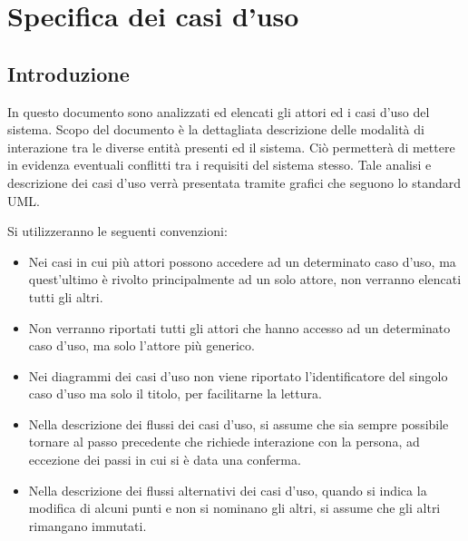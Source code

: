 \chapter{Specifica dei casi d'uso}

\section{Introduzione}
In questo documento sono analizzati ed elencati gli attori ed i casi d'uso del sistema.
Scopo del documento è la dettagliata descrizione delle modalità di interazione tra le diverse entità presenti ed il sistema.
Ciò permetterà di mettere in evidenza eventuali conflitti tra i requisiti del sistema stesso.
Tale analisi e descrizione dei casi d'uso verrà presentata tramite grafici che seguono lo standard UML.

\noindent
Si utilizzeranno le seguenti convenzioni:
\begin{itemize}
	\item Nei casi in cui più attori possono accedere ad un determinato caso d’uso, ma quest'ultimo è rivolto principalmente ad un solo attore, non verranno elencati tutti gli altri.

	\item Non verranno riportati tutti gli attori che hanno accesso ad un determinato caso d'uso, ma solo l'attore più generico.
	
	\item Nei diagrammi dei casi d'uso non viene riportato l'identificatore del singolo caso d'uso ma solo il titolo, per facilitarne la lettura.

	\item Nella descrizione dei flussi dei casi d'uso, si assume che sia sempre possibile tornare al passo precedente che richiede interazione con la persona, ad eccezione dei passi in cui si è data una conferma.

	\item Nella descrizione dei flussi alternativi dei casi d'uso, quando si indica la modifica di alcuni punti e non si nominano gli altri, si assume che gli altri rimangano immutati.
\end{itemize}

